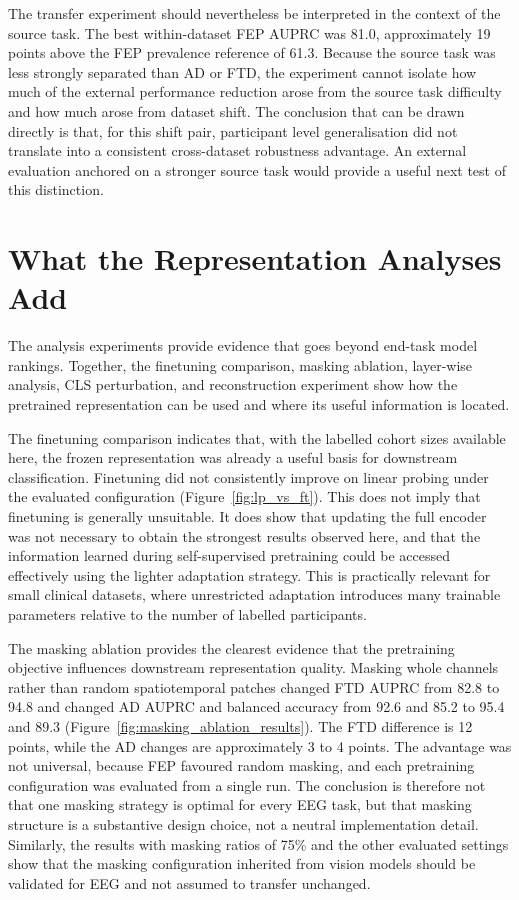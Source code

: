 The transfer experiment should nevertheless be interpreted in the context of the source task. The best within-dataset FEP AUPRC was 81.0, approximately 19 points above the FEP prevalence reference of 61.3. Because the source task was less strongly separated than AD or FTD, the experiment cannot isolate how much of the external performance reduction arose from the source task difficulty and how much arose from dataset shift. The conclusion that can be drawn directly is that, for this shift pair, participant level generalisation did not translate into a consistent cross-dataset robustness advantage. An external evaluation anchored on a stronger source task would provide a useful next test of this distinction.

\section{What the Representation Analyses Add}\label{sec:d_representation}

The analysis experiments provide evidence that goes beyond end-task model rankings. Together, the finetuning comparison, masking ablation, layer-wise analysis, CLS perturbation, and reconstruction experiment show how the pretrained representation can be used and where its useful information is located.

The finetuning comparison indicates that, with the labelled cohort sizes available here, the frozen representation was already a useful basis for downstream classification. Finetuning did not consistently improve on linear probing under the evaluated configuration (Figure~\ref{fig:lp_vs_ft}). This does not imply that finetuning is generally unsuitable. It does show that updating the full encoder was not necessary to obtain the strongest results observed here, and that the information learned during self-supervised pretraining could be accessed effectively using the lighter adaptation strategy. This is practically relevant for small clinical datasets, where unrestricted adaptation introduces many trainable parameters relative to the number of labelled participants.

The masking ablation provides the clearest evidence that the pretraining objective influences downstream representation quality. Masking whole channels rather than random spatiotemporal patches changed FTD AUPRC from 82.8 to 94.8 and changed AD AUPRC and balanced accuracy from 92.6 and 85.2 to 95.4 and 89.3 (Figure~\ref{fig:masking_ablation_results}). The FTD difference is 12 points, while the AD changes are approximately 3 to 4 points. The advantage was not universal, because FEP favoured random masking, and each pretraining configuration was evaluated from a single run. The conclusion is therefore not that one masking strategy is optimal for every EEG task, but that masking structure is a substantive design choice, not a neutral implementation detail. Similarly, the results with masking ratios of 75\% and the other evaluated settings show that the masking configuration inherited from vision models should be validated for EEG and not assumed to transfer unchanged.


